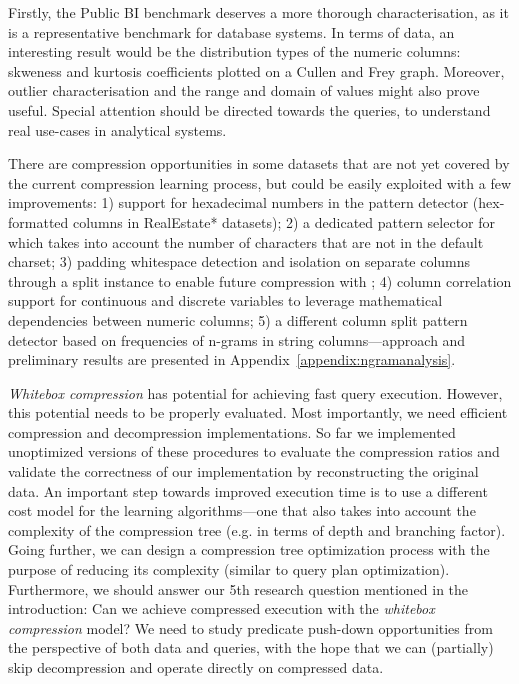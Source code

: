 Firstly, the Public BI benchmark deserves a more thorough characterisation, as it is a representative benchmark for database systems. In terms of data, an interesting result would be the distribution types of the numeric columns: skweness and kurtosis coefficients plotted on a Cullen and Frey graph. Moreover, outlier characterisation and the range and domain of values might also prove useful. Special attention should be directed towards the queries, to understand real use-cases in analytical systems.

There are compression opportunities in some datasets that are not yet covered by the current compression learning process, but could be easily exploited with a few improvements: 1) support for hexadecimal numbers in the  pattern detector (hex-formatted columns in RealEstate* datasets); 2) a dedicated pattern selector for  which takes into account the number of characters that are not in the default charset; 3) padding whitespace detection and isolation on separate columns through a split instance to enable future compression with ; 4) column correlation support for continuous and discrete variables to leverage mathematical dependencies between numeric columns; 5) a different column split pattern detector based on frequencies of n-grams in string columns---approach and preliminary results are presented in Appendix~\ref{appendix:ngramanalysis}.

\textit{Whitebox compression} has potential for achieving fast query execution. However, this potential needs to be properly evaluated. Most importantly, we need efficient compression and decompression implementations. So far we implemented unoptimized versions of these procedures to evaluate the compression ratios and validate the correctness of our implementation by reconstructing the original data. An important step towards improved execution time is to use a different cost model for the learning algorithms---one that also takes into account the complexity of the compression tree (e.g. in terms of depth and branching factor). Going further, we can design a compression tree optimization process with the purpose of reducing its complexity (similar to query plan optimization). Furthermore, we should answer our 5th research question mentioned in the introduction: Can we achieve compressed execution with the \textit{whitebox compression} model? We need to study predicate push-down opportunities from the perspective of both data and queries, with the hope that we can (partially) skip decompression and operate directly on compressed data.


